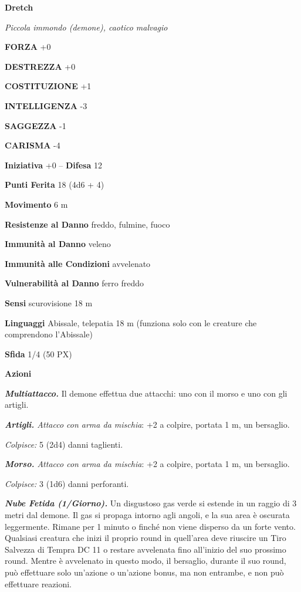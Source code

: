 \begin{multicols}{2}
\medskip{}\textbf{Dretch}

\textit{Piccola immondo (demone), caotico malvagio}

\textbf{FORZA} +0

\textbf{DESTREZZA} +0

\textbf{COSTITUZIONE} +1

\textbf{INTELLIGENZA} -3

\textbf{SAGGEZZA} -1

\textbf{CARISMA} -4

\textbf{Iniziativa} +0 -- \textbf{Difesa} 12

\textbf{Punti Ferita} 18 (4d6 + 4)

\textbf{Movimento} 6 m

\textbf{Resistenze al Danno} freddo, fulmine, fuoco

\textbf{Immunità al Danno} veleno

\textbf{Immunità alle Condizioni} avvelenato

\textbf{Vulnerabilità al Danno} ferro freddo

\textbf{Sensi} scurovisione 18 m

\textbf{Linguaggi} Abissale, telepatia 18 m (funziona solo con le creature che comprendono l'Abissale)

\textbf{Sfida} 1/4 (50 PX)

\textbf{Azioni}

\textit{\textbf{Multiattacco.}} Il demone effettua due attacchi: uno con il morso e uno con gli artigli.

\textit{\textbf{Artigli.} Attacco con arma da mischia}: +2 a colpire, portata 1 m, un bersaglio.

\textit{Colpisce:} 5 (2d4) danni taglienti.

\textit{\textbf{Morso.} Attacco con arma da mischia}: +2 a colpire, portata 1 m, un bersaglio.

\textit{Colpisce:} 3 (1d6) danni perforanti.

\textit{\textbf{Nube Fetida (1/Giorno).}} Un disgustoso gas verde si estende in un raggio di 3 metri dal demone. Il gas si propaga intorno agli angoli, e la sua area è oscurata leggermente. Rimane per 1 minuto o finché non viene disperso da un forte vento. Qualsiasi creatura che inizi il proprio round in quell'area deve riuscire un Tiro Salvezza di Tempra DC 11 o restare avvelenata fino all'inizio del suo prossimo round. Mentre è avvelenato in questo modo, il bersaglio, durante il suo round, può effettuare solo un'azione o un'azione bonus, ma non entrambe, e non può effettuare reazioni.


\end{multicols}
